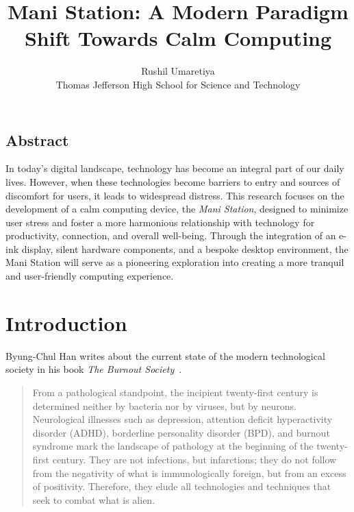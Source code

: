 \documentclass[letterpaper,twocolumn,10pt]{article}
\begin{document}

\graphicspath{{res/}}

\date{}

\title{\Large \bf Mani Station: A Modern Paradigm Shift Towards Calm Computing}

\author{
{\rm Rushil Umaretiya}\\
Thomas Jefferson High School for Science and Technology
}

\maketitle

\subsection*{Abstract}
In today's digital landscape, technology has become an integral part of our daily lives. However, when these technologies become barriers to entry and sources of discomfort for users, it leads to widespread distress. This research focuses on the development of a calm computing device, the \emph{Mani Station}, designed to minimize user stress and foster a more harmonious relationship with technology for productivity, connection, and overall well-being. Through the integration of an e-ink display, silent hardware components, and a bespoke desktop environment, the Mani Station will serve as a pioneering exploration into creating a more tranquil and user-friendly computing experience.

\section{Introduction}

Byung-Chul Han writes about the current state of the modern technological society in his book \emph{The Burnout Society}~\cite{han_butler_2015}.
\begin{quote}
From a pathological standpoint, the incipient twenty-first century is determined neither by bacteria nor by viruses, but by neurons. Neurological illnesses such as depression, attention deficit hyperactivity disorder (ADHD), borderline personality disorder (BPD), and burnout syndrome mark the landscape of pathology at the beginning of the twenty-first century. They are not infections, but infarctions; they do not follow from the negativity of what is immunologically foreign, but from an excess of positivity. Therefore, they elude all technologies and techniques that seek to combat what is alien.
\end{quote}
\end{document}
